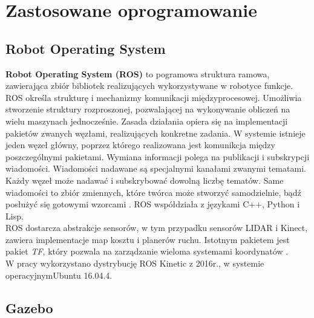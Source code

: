 \chapter{Zastosowane oprogramowanie}

\section{Robot Operating System}

{\textbf{Robot Operating System (ROS)}} to pogramowa struktura ramowa, zawierająca zbiór bibliotek realizujących wykorzystywane w robotyce funkcje. ROS określa strukturę i mechanizmy komunikacji międzyprocesowej. Umożliwia stworzenie struktury rozproszonej, pozwalającej na wykonywanie obliczeń na wielu maszynach jednocześnie. Zasada działania opiera się na implementacji pakietów zwanych węzłami, realizujących konkretne zadania. W systemie istnieje jeden węzeł główny, poprzez którego realizowana jest komunikcja między poszczególnymi pakietami. Wymiana informacji polega na publikacji i subskrypcji wiadomości. Wiadomości nadawane są specjalnymi kanałami zwanymi tematami. Każdy węzeł może nadawać i subskrybować dowolną liczbę tematów. Same wiadomości to zbiór zmiennych, które twórca może stworzyć samodzielnie, bądź posłużyć się gotowymi wzorcami \cite{ROS}. ROS współdziała z  językami C++, Python i Lisp. \\
{\indent} ROS dostarcza abstrakcje sensorów, w tym przypadku sensorów LIDAR i Kinect, zawiera implementacje map kosztu i planerów ruchu. Istotnym pakietem jest pakiet {\textit{TF}}, który pozwala na zarządzanie wieloma systemami koordynatów \cite{prob}. \\
{\indent} W pracy wykorzystano dystrybucję ROS Kinetic z 2016r., w systemie operacyjnymUbuntu 16.04.4.

\section{Gazebo}

